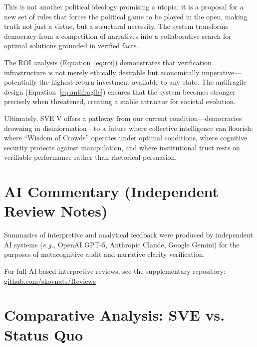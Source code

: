 \documentclass[11pt,a4paper]{article}
\begin{document}
This is not another political ideology promising a utopia; it is a proposal for a new set of rules that forces the political game to be played in the open, making truth not just a virtue, but a structural necessity. The system transforms democracy from a competition of narratives into a collaborative search for optimal solutions grounded in verified facts.

The ROI analysis (Equation~\eqref{eq:roi}) demonstrates that verification infrastructure is not merely ethically desirable but economically imperative—potentially the highest-return investment available to any state. The antifragile design (Equation~\eqref{eq:antifragile}) ensures that the system becomes stronger precisely when threatened, creating a stable attractor for societal evolution.

Ultimately, SVE V offers a pathway from our current condition—democracies drowning in disinformation—to a future where collective intelligence can flourish: where ``Wisdom of Crowds'' operates under optimal conditions, where cognitive security protects against manipulation, and where institutional trust rests on verifiable performance rather than rhetorical persuasion.

\section*{AI Commentary (Independent Review Notes)}
Summaries of interpretive and analytical feedback were produced by independent AI systems 
(\textit{e.g.}, OpenAI GPT-5, Anthropic Claude, Google Gemini) 
for the purposes of metacognitive audit and narrative clarity verification.  

For full AI-based interpretive reviews, see the supplementary repository:  
\href{https://codeberg.org/skovnats/SVE-Systemic-Verification-Engineering/tree/master/Reviews}{github.com/skovnats/Reviews}





\clearpage
\appendix

\section{Comparative Analysis: SVE vs. Status Quo}
\label{app:comparison}
\end{document}
